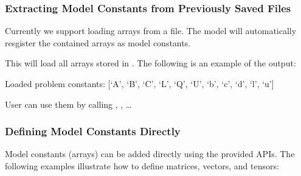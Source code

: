 \documentclass[letterpaper,10pt,english,openany,oneside]{sphinxmanual}
\begin{document}
\subsubsection{Extracting Model Constants from Previously Saved Files}
\label{\detokenize{user-guide/defining-the-problem:extracting-model-constants-from-previously-saved-files}}
\sphinxAtStartPar
Currently we support loading arrays from a  file. The model will automatically resgister the contained arrays as model constants.

\begin{sphinxVerbatim}[commandchars=\\\{\}]
  
\end{sphinxVerbatim}

\sphinxAtStartPar
This will load all arrays stored in . The following is an example of the output:

\sphinxAtStartPar
Loaded problem constants: {[}‘A’, ‘B’, ‘C’, ‘L’, ‘Q’, ‘U’, ‘b’, ‘c’, ‘d’, ‘l’, ‘u’{]}

\sphinxAtStartPar
User can use them by calling , , …


\subsubsection{Defining Model Constants Directly}
\label{\detokenize{user-guide/defining-the-problem:defining-model-constants-directly}}
\sphinxAtStartPar
Model constants (arrays) can be added directly using the provided APIs. The following examples illustrate how to define matrices, vectors, and tensors:
\end{document}
